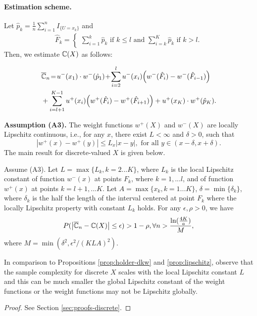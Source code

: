 \paragraph{Estimation scheme.} 
Let $\hat p_k= \frac{1}{n} \sum_{i=1}^n I_{\{U =x_k\}}$ and 
\begin{align}
\label{eq:Fkhat}
 \hat F_k = 
\begin{cases}
   \sum_{i=1}^k \hat p_k  \text{ if   } k \leq l \text{ and }
   \sum_{i=k}^K \hat p_k  \text{ if  }  k > l.
\end{cases}  
\end{align}
Then, we estimate $\mathbb{C}(X)$ as follows:
\begin{small}
\begin{align}
&\overline {\mathbb{C}}_n \!=\! 
u^-(x_1)\cdot w^-(\hat p_1) \!+\!\sum_{i=2}^l u^-(x_i) \Big(w^-(\hat F_i) - w^-( \hat F_{i-1})\Big) 
\nonumber\\
&
+ \sum_{i=l+1}^{K-1} u^+(x_i) \Big(w^+(\hat F_i) - w^+(\hat F_{i+1}) \Big) + u^+(x_K)\cdot w^+(\hat p_K). \label{eq:cpt-discrete-est}
\end{align}
\end{small}
\textbf{Assumption (A3).}  The weight functions $w^+(X)$ and $w^-(X)$ are locally Lipschitz continuous, i.e., for any $x$, there exist  $L< \infty$ and $\delta>0$, such that
$$| w^+(x) - w^+(y) | \leq L_x |x-y|, \text{ for all } y \in (x-\delta,x+\delta). $$
The main result for discrete-valued $X$ is given below.
\begin{proposition}
\label{prop:sample-complexity-discrete}
Assume (A3). Let $L=\max\{L_k, k=2...K\} $, where $L_k$ is the local Lipschitz constant of function $w^-(x)$ at points
$F_k$, where $k=1,...l$, and of function $w^+(x)$ at points $k=l+1,...K$. 
Let $A=\max\{x_k, k=1...K\}$, $\delta =\min\{\delta_k\}$, where $\delta_k$ is the half the length of the interval centered at point $F_k$ where the locally Lipschitz property with constant $L_k$ holds.
For any $\epsilon,\rho >0$, we have 
\begin{align}
P(\left|
\overline {\mathbb{C}}_n -\mathbb{C}(X)
\right| \leq \epsilon) > 1-\rho, \forall n> \frac{\ln(\frac{4K}{a})} { M}, 
\end{align}
where $M=\min(\delta^2, \epsilon^2/(KLA)^2)$.
\end{proposition}
In comparison to Propositions \ref{prop:holder-dkw} and \ref{prop:lipschitz}, 
observe that the sample complexity for discrete $X$ scales with the local Lipschitz constant $L$ and this can be much smaller the global Lipschitz constant of the weight functions or the weight functions may not be Lipschitz globally.  
\begin{proof}
 See Section \ref{sec:proofs-discrete}.
\end{proof}

